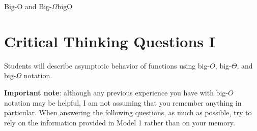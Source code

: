 \documentclass{tufte-handout}
\begin{document}
\begin{model}{Big-O and Big-$\Omega$}{bigO}
\begin{center}
\begin{minipage}{\textwidth}
\end{minipage}

\end{center}
\end{model}

\newpage
\section{Critical Thinking Questions I}
\begin{objective}
  Students will describe asymptotic behavior of functions
  using big-$O$, big-$\Theta$, and big-$\Omega$ notation.
\end{objective}

\textbf{Important note}: although any previous experience you have
with big-$O$ notation may be helpful, I am not assuming that you
remember anything in particular.  When answering the following
questions, as much as possible, try to rely on the information
provided in Model 1 rather than on your memory.
\end{document}
